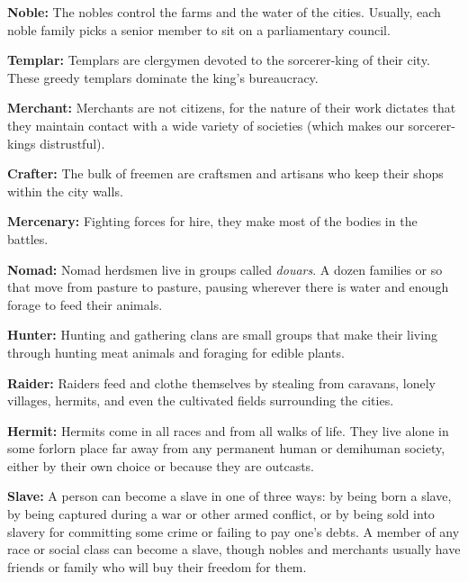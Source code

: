 \begin{itemize*}
	\item \textbf{Noble:} The nobles control the farms and the water of the cities. Usually, each noble family picks a senior member to sit on a parliamentary council.
	\item \textbf{Templar:} Templars are clergymen devoted to the sorcerer-king of their city. These greedy templars dominate the king's bureaucracy.
	\item \textbf{Merchant:} Merchants are not citizens, for the nature of their work dictates that they maintain contact with a wide variety of societies (which makes our sorcerer-kings distrustful).
	\item \textbf{Crafter:}  The bulk of freemen are craftsmen and artisans who keep their shops within the city walls.
	\item \textbf{Mercenary:} Fighting forces for hire, they make most of the bodies in the battles. %
	\item \textbf{Nomad:} Nomad herdsmen live in groups called \textit{douars}. A dozen families or so that move from pasture to pasture, pausing wherever there is water and enough forage to feed their animals. %
	\item \textbf{Hunter:} Hunting and gathering clans are small groups that make their living through hunting meat animals and foraging for edible plants.
	\item \textbf{Raider:} Raiders feed and clothe themselves by stealing from caravans, lonely villages, hermits, and even the cultivated fields surrounding the cities. %
	\item \textbf{Hermit:} Hermits come in all races and from all walks of life. They live alone in some forlorn place far away from any permanent human or demihuman society, either by their own choice or because they are outcasts.
	\item \textbf{Slave:} A person can become a slave in one of three ways: by being born a slave, by being captured during a war or other armed conflict, or by being sold into slavery for committing some crime or failing to pay one's debts. A member of any race or social class can become a slave, though nobles and merchants usually have friends or family who will buy their freedom for them.
\end{itemize*}



